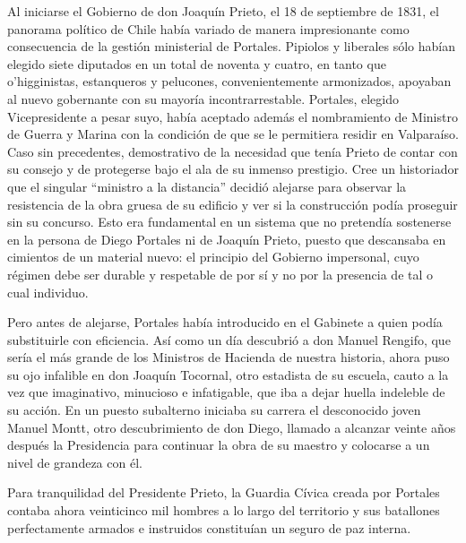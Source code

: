 \documentclass[10pt,twoside,openright]{memoir}
\begin{document}
Al iniciarse el Gobierno de don Joaquín Prieto, el 18 de septiembre de
1831, el panorama político de Chile había variado de manera
impresionante como consecuencia de la gestión ministerial de Portales.
Pipiolos y liberales sólo habían elegido siete diputados en un total de
noventa y cuatro, en tanto que o'higginistas, estanqueros y pelucones,
convenientemente armonizados, apoyaban al nuevo gobernante con su
mayoría incontrarrestable. Portales, elegido Vicepresidente a pesar
suyo, había aceptado además el nombramiento de Ministro de Guerra y
Marina con la condición de que se le permitiera residir en Valparaíso.
Caso sin precedentes, demostrativo de la necesidad que tenía Prieto de
contar con su consejo y de protegerse bajo el ala de su inmenso
prestigio. Cree un historiador que el singular ``ministro a la distancia''
decidió alejarse para observar la resistencia de la obra gruesa de su
edificio y ver si la construcción podía proseguir sin su concurso. Esto
era fundamental en un sistema que no pretendía sostenerse en la persona
de Diego Portales ni de Joaquín Prieto, puesto que descansaba en
cimientos de un material nuevo: el principio del Gobierno impersonal,
cuyo régimen debe ser durable y respetable de por sí y no por la
presencia de tal o cual individuo.

Pero antes de alejarse, Portales había introducido en el Gabinete a
quien podía substituirle con eficiencia. Así como un día descubrió a don
Manuel Rengifo, que sería el más grande de los Ministros de Hacienda de
nuestra historia, ahora puso su ojo infalible en don Joaquín Tocornal,
otro estadista de su escuela, cauto a la vez que imaginativo, minucioso
e infatigable, que iba a dejar huella indeleble de su acción. En un
puesto subalterno iniciaba su carrera el desconocido joven Manuel Montt,
otro descubrimiento de don Diego, llamado a alcanzar veinte años después
la Presidencia para continuar la obra de su maestro y colocarse a un
nivel de grandeza con él.

Para tranquilidad del Presidente Prieto, la Guardia Cívica creada por
Portales contaba ahora veinticinco mil hombres a lo largo del territorio
y sus batallones perfectamente armados e instruidos constituían un
seguro de paz interna.
\end{document}
